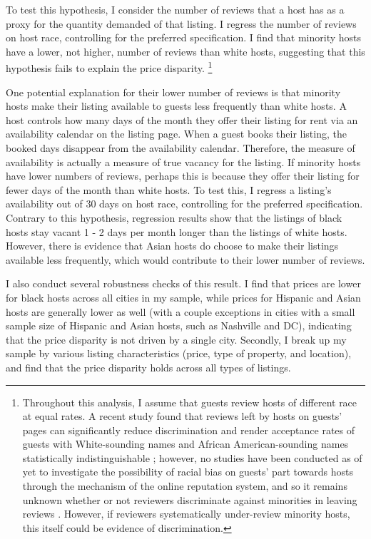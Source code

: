 To test this hypothesis, I consider the number of reviews that a host has as a proxy for the quantity demanded of that listing. I regress the number of reviews on host race, controlling for the preferred specification. I find that minority hosts have a lower, not higher, number of reviews than white hosts, suggesting that this hypothesis fails to explain the price disparity.%
	\footnote{Throughout this analysis, I assume that guests review hosts of different race at equal rates. A recent study found that reviews left by hosts on guests’ pages can significantly reduce discrimination and render acceptance rates of guests with White-sounding names and African American-sounding names statistically indistinguishable \citep{cui}; however, no studies have been conducted as of yet to investigate the possibility of racial bias on guests’ part towards hosts through the mechanism of the online reputation system, and so it remains unknown whether or not reviewers discriminate against minorities in leaving reviews \citep{ye}. However, if reviewers systematically under-review minority hosts, this itself could be evidence of discrimination.} 

One potential explanation for their lower number of reviews is that minority hosts make their listing available to guests less frequently than white hosts. A host controls how many days of the month they offer their listing for rent via an availability calendar on the listing page. When a guest books their listing, the booked days disappear from the availability calendar. Therefore, the measure of availability is actually a measure of true vacancy for the listing. If minority hosts have lower numbers of reviews, perhaps this is because they offer their listing for fewer days of the month than white hosts. To test this, I regress a listing's availability out of 30 days on host race, controlling for the preferred specification. Contrary to this hypothesis, regression results show that the listings of black hosts stay vacant 1 - 2 days per month longer than the listings of white hosts. However, there is evidence that Asian hosts do choose to make their listings available less frequently, which would contribute to their lower number of reviews. 






I also conduct several robustness checks of this result. I find that prices are lower for black hosts across all cities in my sample, while prices for Hispanic and Asian hosts are generally lower as well (with a couple exceptions in cities with a small sample size of Hispanic and Asian hosts, such as Nashville and DC), indicating that the price disparity is not driven by a single city. Secondly, I break up my sample by various listing characteristics (price, type of property, and location), and find that the price disparity holds across all types of listings. 

